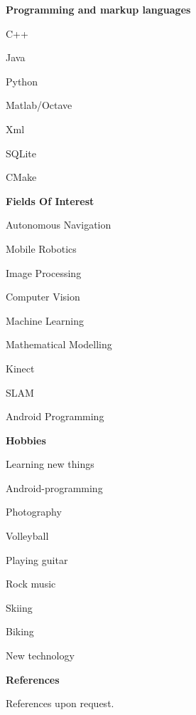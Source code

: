 \documentclass[a4paper,12pt,final]{memoir}
\newcommand{\Sep}{\vspace{1.5em}}
\newcommand{\SmallSep}{\vspace{0.5em}}
\newcommand{\CVSection}[1]
	{\Large\textbf{#1}\par
	\SmallSep\normalsize\normalfont}
\newcommand{\CVItem}[1]
	{\textbf{\color{MidnightBlue} #1}}
\begin{document}
\CVItem{Programming and markup languages}
\begin{multicols}{3}
\begin{compactitem}[\color{MidnightBlue}$\circ$]
	\item C++ 
	\item Java 
	\item Python 
	\item Matlab/Octave 
	\item Xml
	\item SQLite
	\item CMake
\end{compactitem}
\end{multicols}
\SmallSep

\framebreak
\clearpage
\framebreak
\framebreak

\CVSection{Fields Of Interest}
\begin{compactitem}[\color{MidnightBlue}$\circ$]
	\item Autonomous Navigation
	\item Mobile Robotics
	\item Image Processing 
	\item Computer Vision 
	\item Machine Learning
	\item Mathematical Modelling
	\item Kinect 
	\item SLAM
	\item Android Programming
\end{compactitem}
\Sep 

\CVSection{Hobbies}
\begin{compactitem}[\color{MidnightBlue}$\circ$]
	\item Learning new things
	\item Android-programming
	\item Photography
	\item Volleyball
	\item Playing guitar 
	\item Rock music
	\item Skiing
	\item Biking
	\item New technology
\end{compactitem}
\Sep
\CVSection{References}
References upon request.
\clearpage
\framebreak

\end{document}
